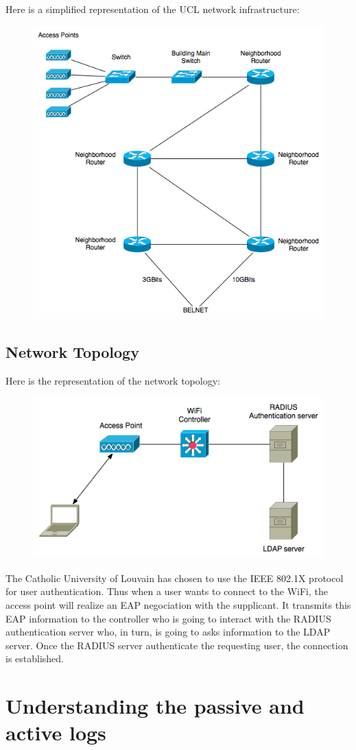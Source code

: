 Here is a simplified representation of the UCL network infrastructure:
\begin{figure}[H]
	\includegraphics[width=.9\linewidth]{Pictures/Chapter2/infrastructure.png}
\end{figure}

\subsection{Network Topology}
Here is the representation of the network topology:
\begin{figure}[H]
	\includegraphics[width=.9\linewidth]{Pictures/Chapter2/topology.png}
\end{figure}
The Catholic University of Louvain has chosen to use the IEEE 802.1X protocol for user authentication. Thus when a user wants to connect to the WiFi, the access point will realize an EAP negociation with the supplicant. It transmits this EAP information to the controller who is going to interact with the RADIUS authentication server who, in turn, is going to asks information to the LDAP server. Once the RADIUS server authenticate the requesting user, the connection is established.




\section{Understanding the passive and active logs}